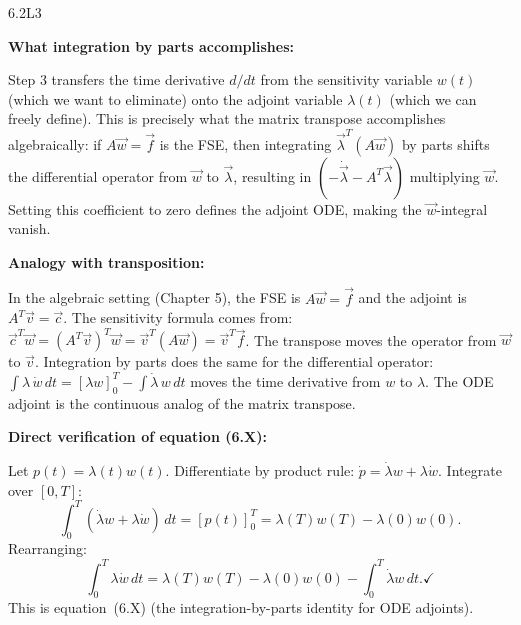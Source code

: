 \begin{solution}{6.2}{L3}

\solanswer

\textbf{What integration by parts accomplishes:}

Step 3 transfers the time derivative $d/dt$ from the sensitivity variable
$w(t)$ (which we want to eliminate) onto the adjoint variable $\lambda(t)$
(which we can freely define). This is precisely what the matrix transpose
accomplishes algebraically: if $A\vec{w} = \vec{f}$ is the FSE, then
integrating $\vec{\lambda}^T(A\vec{w})$ by parts shifts the differential
operator from $\vec{w}$ to $\vec{\lambda}$, resulting in $(-\dot{\vec{\lambda}}
- A^T\vec{\lambda})$ multiplying $\vec{w}$. Setting this coefficient to zero
defines the adjoint ODE, making the $\vec{w}$-integral vanish.

\textbf{Analogy with transposition:}

In the algebraic setting (Chapter 5), the FSE is $A\vec{w} = \vec{f}$
and the adjoint is $A^T\vec{v} = \vec{c}$. The sensitivity formula comes from:
$\vec{c}^T\vec{w} = (A^T\vec{v})^T\vec{w} = \vec{v}^T(A\vec{w}) = \vec{v}^T\vec{f}$.
The transpose moves the operator from $\vec{w}$ to $\vec{v}$.
Integration by parts does the same for the differential operator:
$\int\lambda\,\dot{w}\,dt = [\lambda w]_0^T - \int\dot{\lambda}\,w\,dt$
moves the time derivative from $w$ to $\lambda$.
The ODE adjoint is the continuous analog of the matrix transpose.

\textbf{Direct verification of equation (6.X):}

Let $p(t) = \lambda(t)w(t)$. Differentiate by product rule:
$\dot{p} = \dot{\lambda}w + \lambda\dot{w}$.
Integrate over $[0,T]$:
\[
  \int_0^T (\dot{\lambda}w + \lambda\dot{w})\,dt = [p(t)]_0^T = \lambda(T)w(T) - \lambda(0)w(0).
\]
Rearranging:
\[
  \int_0^T \lambda\dot{w}\,dt = \lambda(T)w(T) - \lambda(0)w(0) - \int_0^T \dot{\lambda}w\,dt. \checkmark
\]
This is equation~(6.X) (the integration-by-parts identity for ODE adjoints).


\end{solution}

